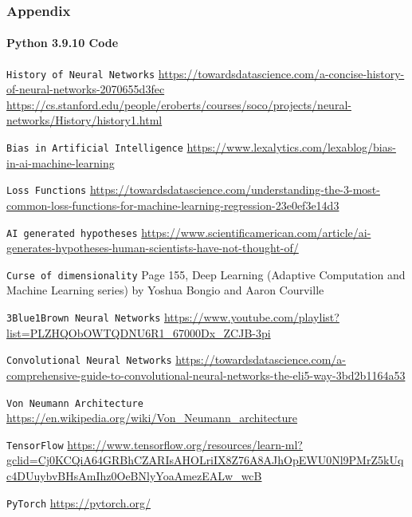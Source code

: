 \documentclass{beamer}
\begin{document}
\begin{frame}
\frametitle{Appendix}
\framesubtitle{Python 3.9.10 Code}
\begin{thebibliography}{9}
    \texttt{History of Neural Networks}
    \url{https://towardsdatascience.com/a-concise-history-of-neural-networks-2070655d3fec}
    \url{https://cs.stanford.edu/people/eroberts/courses/soco/projects/neural-networks/History/history1.html}
   
    \texttt{Bias in Artificial Intelligence}
    \url{https://www.lexalytics.com/lexablog/bias-in-ai-machine-learning}

    \texttt{Loss Functions}
    \url{https://towardsdatascience.com/understanding-the-3-most-common-loss-functions-for-machine-learning-regression-23e0ef3e14d3}

    \texttt{AI generated hypotheses}
    \url{https://www.scientificamerican.com/article/ai-generates-hypotheses-human-scientists-have-not-thought-of/}

    \texttt{Curse of dimensionality}
    Page 155, Deep Learning (Adaptive Computation and Machine Learning series) by Yoshua Bongio and Aaron Courville

    \texttt{3Blue1Brown Neural Networks}
    \url{https://www.youtube.com/playlist?list=PLZHQObOWTQDNU6R1_67000Dx_ZCJB-3pi}

    \texttt{Convolutional Neural Networks}
    \url{https://towardsdatascience.com/a-comprehensive-guide-to-convolutional-neural-networks-the-eli5-way-3bd2b1164a53}

    \texttt{Von Neumann Architecture}
    \url{https://en.wikipedia.org/wiki/Von_Neumann_architecture}

    \texttt{TensorFlow}
    \url{https://www.tensorflow.org/resources/learn-ml?gclid=Cj0KCQiA64GRBhCZARIsAHOLriIX8Z76A8AJhOpEWU0Nl9PMrZ5kUqc4DUuybvBHsAmIhz0OeBNlyYoaAmezEALw_wcB}

    \texttt{PyTorch}
    \url{https://pytorch.org/}
\end{thebibliography}
\end{frame}
\end{document}
